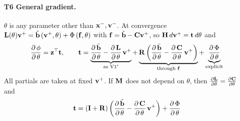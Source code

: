 \paragraph{T6 General gradient.}\mbox{}
\newline $\theta$ is any parameter other than $\x^-, \vv^-$. At convergence $\LL(\theta)\vv^+ = \tilde\bb\left(\vv^+, \theta\right) + \Phi\left(\f, \theta\right)$ with $\f = \tilde\bb - \C\vv^+$, so $\mathbf{H}\,d\vv^+ = \tvb\,d\theta$ and
\begin{equation}
\label{eq:npd_v2_general_gradient}
    \pd{\phi}{\theta} = \z^\top\tvb,
    \qquad
    \tvb = \underbrace{\pd{\tilde\bb}{\theta} - \pd{\LL}{\theta}\,\vv^+}_{\text{as V1}'}
    + \underbrace{\R\left(\pd{\tilde\bb}{\theta} - \pd{\C}{\theta}\,\vv^+\right)}_{\text{through } \f}
    + \underbrace{\pd{\Phi}{\theta}}_{\text{explicit}}
\end{equation}
\noindent All partials are taken at fixed $\vv^+$. If $\M$ does not depend on $\theta$, then $\pdc{\LL}{\theta} = \pdc{\C}{\theta}$ and
\begin{equation*}
    \tvb = \left(\I + \R\right)\left(\pd{\tilde\bb}{\theta} - \pd{\C}{\theta}\,\vv^+\right) + \pd{\Phi}{\theta}
\end{equation*}


